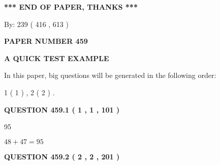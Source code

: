 \documentclass[12pt]{article}
\begin{document}
   
   
   
   
\vspace{1.0in} 
{\textbf{\large{ *** END OF PAPER, THANKS *** }}} 
   
   
\hspace{1.0in} By: 
 239 ( 416 ,  613 )
   
   
   
   
\newpage 
\setcounter{page}{ 
   459001 } 
   
   
   
   
 {\textbf{ \Large{ PAPER NUMBER  459  }}}
   
   
\vspace{0.2in}
   
   
   
   
   
   
 \vspace{0.2in}
{\LARGE {\textbf{ A QUICK TEST EXAMPLE}}}
   
   
   
\vspace{0.2in}
   
In this paper, big questions will be generated in the following order: 
   
   
   1 ( 1 )
 ,
   2 ( 2 )
 .
  
\vspace{0.2in}
  
{\textbf{\Large{QUESTION
459.1 
 ( 1 , 1 , 101 )
}}}
  
  
 
 
\noindent{}

95
 
 
 
 
\noindent{}

$ %
48 +  %
47=   %
95$
 
 
  
\vspace{0.2in}
  
{\textbf{\Large{QUESTION
459.2 
 ( 2 , 2 , 201 )
}}}
  
  
 
 
\noindent{}
 
\end{document}
